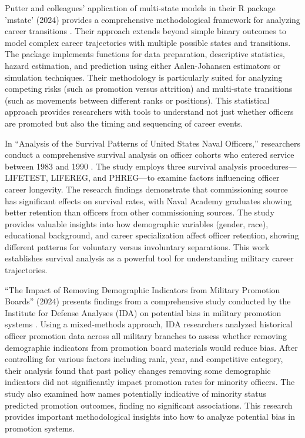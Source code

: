 \documentclass[../main.tex]{subfiles}
\begin{document}
Putter and colleagues' application of multi-state models in their R package 'mstate' (2024) provides a comprehensive methodological framework for analyzing career transitions \citep{putter2024}. Their approach extends beyond simple binary outcomes to model complex career trajectories with multiple possible states and transitions. The package implements functions for data preparation, descriptive statistics, hazard estimation, and prediction using either Aalen-Johansen estimators or simulation techniques. Their methodology is particularly suited for analyzing competing risks (such as promotion versus attrition) and multi-state transitions (such as movements between different ranks or positions). This statistical approach provides researchers with tools to understand not just whether officers are promoted but also the timing and sequencing of career events.

In ``Analysis of the Survival Patterns of United States Naval Officers,'' researchers conduct a comprehensive survival analysis on officer cohorts who entered service between 1983 and 1990 \citep{naval_survival}. The study employs three survival analysis procedures—LIFETEST, LIFEREG, and PHREG—to examine factors influencing officer career longevity. The research findings demonstrate that commissioning source has significant effects on survival rates, with Naval Academy graduates showing better retention than officers from other commissioning sources. The study provides valuable insights into how demographic variables (gender, race), educational background, and career specialization affect officer retention, showing different patterns for voluntary versus involuntary separations. This work establishes survival analysis as a powerful tool for understanding military career trajectories.

``The Impact of Removing Demographic Indicators from Military Promotion Boards'' (2024) presents findings from a comprehensive study conducted by the Institute for Defense Analyses (IDA) on potential bias in military promotion systems \citep{ida2024}. Using a mixed-methods approach, IDA researchers analyzed historical officer promotion data across all military branches to assess whether removing demographic indicators from promotion board materials would reduce bias. After controlling for various factors including rank, year, and competitive category, their analysis found that past policy changes removing some demographic indicators did not significantly impact promotion rates for minority officers. The study also examined how names potentially indicative of minority status predicted promotion outcomes, finding no significant associations. This research provides important methodological insights into how to analyze potential bias in promotion systems.
\end{document}
